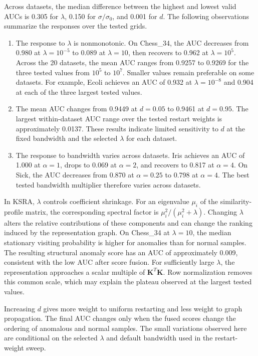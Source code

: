 \documentclass[ASNA,twocolumn]{USG} %
\begin{document}
Across datasets, the median difference between the highest and lowest valid AUCs is 0.305 for $\lambda$, 0.150 for $\sigma/\sigma_0$, and 0.001 for $d$. The following observations summarize the responses over the tested grids.

\begin{enumerate}[\indent (1)]
    \item The response to $\lambda$ is nonmonotonic. On Chess\_34, the AUC decreases from 0.980 at $\lambda=10^{-5}$ to 0.089 at $\lambda=10$, then recovers to 0.962 at $\lambda=10^5$. Across the 20 datasets, the mean AUC ranges from 0.9257 to 0.9269 for the three tested values from $10^5$ to $10^7$. Smaller values remain preferable on some datasets. For example, Ecoli achieves an AUC of 0.932 at $\lambda=10^{-8}$ and 0.904 at each of the three largest tested values.

    \item The mean AUC changes from 0.9449 at $d=0.05$ to 0.9461 at $d=0.95$. The largest within-dataset AUC range over the tested restart weights is approximately 0.0137. These results indicate limited sensitivity to $d$ at the fixed bandwidth and the selected $\lambda$ for each dataset.

    \item The response to bandwidth varies across datasets. Iris achieves an AUC of 1.000 at $\alpha=1$, drops to 0.069 at $\alpha=2$, and recovers to 0.817 at $\alpha=4$. On Sick, the AUC decreases from 0.870 at $\alpha=0.25$ to 0.798 at $\alpha=4$. The best tested bandwidth multiplier therefore varies across datasets.
\end{enumerate}

In KSRA, $\lambda$ controls coefficient shrinkage. For an eigenvalue $\mu_i$ of the similarity-profile matrix, the corresponding spectral factor is $\mu_i^2/(\mu_i^2+\lambda)$. Changing $\lambda$ alters the relative contributions of these components and can change the ranking induced by the representation graph. On Chess\_34 at $\lambda=10$, the median stationary visiting probability is higher for anomalies than for normal samples. The resulting structural anomaly score has an AUC of approximately 0.009, consistent with the low AUC after score fusion. For sufficiently large $\lambda$, the representation approaches a scalar multiple of $\boldsymbol{K}^T \boldsymbol{K}$. Row normalization removes this common scale, which may explain the plateau observed at the largest tested values.

Increasing $d$ gives more weight to uniform restarting and less weight to graph propagation. The final AUC changes only when the fused scores change the ordering of anomalous and normal samples. The small variations observed here are conditional on the selected $\lambda$ and default bandwidth used in the restart-weight sweep.
\end{document}
